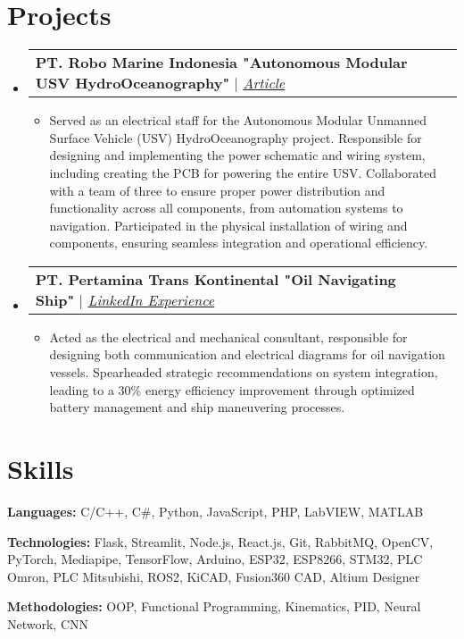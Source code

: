 \documentclass[letterpaper,11pt]{article}
\makeatletter
\newcommand{\resumeItem}[1]{
  \item\small{
    {#1 \vspace{-2pt}}
  }
}
\newcommand{\resumeProjectHeading}[2]{
    \vspace{-2pt}\item
    \begin{tabular*}{0.97\textwidth}{l@{\extracolsep{\fill}}r}
      \small#1 & #2 \\
    \end{tabular*}\vspace{-7pt}
}
\newcommand{\resumeSubHeadingListStart}{\begin{itemize}[leftmargin=0.15in, label={}]}
\newcommand{\resumeSubHeadingListEnd}{\end{itemize}}
\newcommand{\resumeItemListStart}{\begin{itemize}}
\newcommand{\resumeItemListEnd}{\end{itemize}\vspace{-5pt}}
\makeatother
\begin{document}

\section{Projects}
    \vspace{3pt}
    \resumeSubHeadingListStart            
      \resumeProjectHeading
            {\textbf{PT. Robo Marine Indonesia "Autonomous Modular USV HydroOceanography"} $|$ \emph{\href{https://www.linkedin.com/feed/update/urn:li:activity:7245271363135922177/}{\color{blue}Article}}}{}
          \resumeItemListStart
            \resumeItem{Served as an electrical staff for the Autonomous Modular Unmanned Surface Vehicle (USV) HydroOceanography project. Responsible for designing and implementing the power schematic and wiring system, including creating the PCB for powering the entire USV. Collaborated with a team of three to ensure proper power distribution and functionality across all components, from automation systems to navigation. Participated in the physical installation of wiring and components, ensuring seamless integration and operational efficiency.}
          \resumeItemListEnd

     \resumeProjectHeading
        {\textbf{PT. Pertamina Trans Kontinental "Oil Navigating Ship"} $|$ \emph{\href{https://www.linkedin.com/in/jonathan-oktaviano/details/projects/}{\color{blue}LinkedIn Experience}}}{}
          \resumeItemListStart
            \resumeItem{Acted as the electrical and mechanical consultant, responsible for designing both communication and electrical diagrams for oil navigation vessels. Spearheaded strategic recommendations on system integration, leading to a 30\% energy efficiency improvement through optimized battery management and ship maneuvering processes.}
          \resumeItemListEnd
          
    \resumeSubHeadingListEnd

    

\section{Skills}
  \vspace{2pt}
  \resumeSubHeadingListStart
    \small{\item{
        
        \textbf{Languages:}{ C/C++, C\#, Python, JavaScript, PHP, LabVIEW, MATLAB} \\ \vspace{3pt}
        
        \textbf{Technologies:}{ Flask, Streamlit, Node.js, React.js, Git, RabbitMQ, OpenCV, PyTorch, Mediapipe, TensorFlow, Arduino, ESP32, ESP8266, STM32, PLC Omron, PLC Mitsubishi, ROS2, KiCAD, Fusion360 CAD, Altium Designer} \\ \vspace{3pt}
        
        \textbf{Methodologies:} {OOP, Functional Programming, Kinematics, PID, Neural Network, CNN} \\ \vspace{3pt}
        
    }}
  \resumeSubHeadingListEnd
\end{document}
